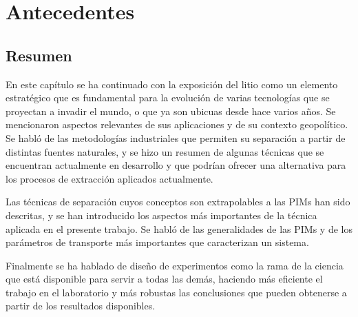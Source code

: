 \chapter{Antecedentes}%













\section{Resumen}
En este capítulo se ha continuado con la exposición del litio como un elemento estratégico que es fundamental para la evolución de varias tecnologías que se proyectan a invadir el mundo, o que ya son ubicuas desde hace varios años. Se mencionaron aspectos relevantes de sus aplicaciones y de su contexto geopolítico. Se habló de las metodologías industriales que permiten su separación a partir de distintas fuentes naturales, y se hizo un resumen de algunas técnicas que se encuentran actualmente en desarrollo y que podrían ofrecer una alternativa para los procesos de extracción aplicados actualmente.

Las técnicas de separación cuyos conceptos son extrapolables a las \ac{PIM}s han sido descritas, y se han introducido los aspectos más importantes de la técnica aplicada en el presente trabajo. Se habló de las generalidades de las \ac{PIM}s y de los parámetros de transporte más importantes que caracterizan un sistema.

Finalmente se ha hablado de diseño de experimentos como la rama de la ciencia que está disponible para servir a todas las demás, haciendo más eficiente el trabajo en el laboratorio y más robustas las conclusiones que pueden obtenerse a partir de los resultados disponibles.

\clearpage
{}